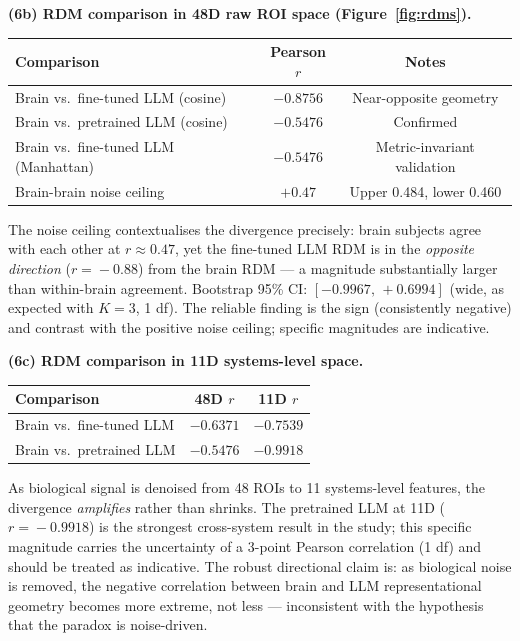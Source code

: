 \documentclass{article}
\begin{document}
\textbf{(6b) RDM comparison in 48D raw ROI space (Figure~\ref{fig:rdms}).}

\begin{center}
\small
\begin{tabular}{lcc}
\toprule
Comparison & Pearson $r$ & Notes \\
\midrule
Brain vs.\ fine-tuned LLM (cosine)   & $-0.8756$ & Near-opposite geometry \\
Brain vs.\ pretrained LLM (cosine)   & $-0.5476$ & Confirmed \\
Brain vs.\ fine-tuned LLM (Manhattan)& $-0.5476$ & Metric-invariant validation \\
Brain-brain noise ceiling             & $+0.47$   & Upper 0.484, lower 0.460 \\
\bottomrule
\end{tabular}
\end{center}

The noise ceiling contextualises the divergence precisely: brain subjects agree with
each other at $r\!\approx\!0.47$, yet the fine-tuned LLM RDM is in the \emph{opposite
direction} ($r\!=\!-0.88$) from the brain RDM --- a magnitude substantially larger
than within-brain agreement.
Bootstrap 95\% CI: $[-0.9967,\,+0.6994]$ (wide, as expected with $K\!=\!3$, 1 df).
The reliable finding is the sign (consistently negative) and contrast with the positive
noise ceiling; specific magnitudes are indicative.

\textbf{(6c) RDM comparison in 11D systems-level space.}

\begin{center}
\small
\begin{tabular}{lcc}
\toprule
Comparison & 48D $r$ & 11D $r$ \\
\midrule
Brain vs.\ fine-tuned LLM  & $-0.6371$ & $-0.7539$ \\
Brain vs.\ pretrained LLM  & $-0.5476$ & $-0.9918$ \\
\bottomrule
\end{tabular}
\end{center}

As biological signal is denoised from 48 ROIs to 11 systems-level features, the
divergence \emph{amplifies} rather than shrinks.
The pretrained LLM at 11D ($r\!=\!-0.9918$) is the strongest cross-system result in
the study; this specific magnitude carries the uncertainty of a 3-point Pearson
correlation (1 df) and should be treated as indicative.
The robust directional claim is: as biological noise is removed, the negative
correlation between brain and LLM representational geometry becomes more extreme,
not less --- inconsistent with the hypothesis that the paradox is noise-driven.
\end{document}
